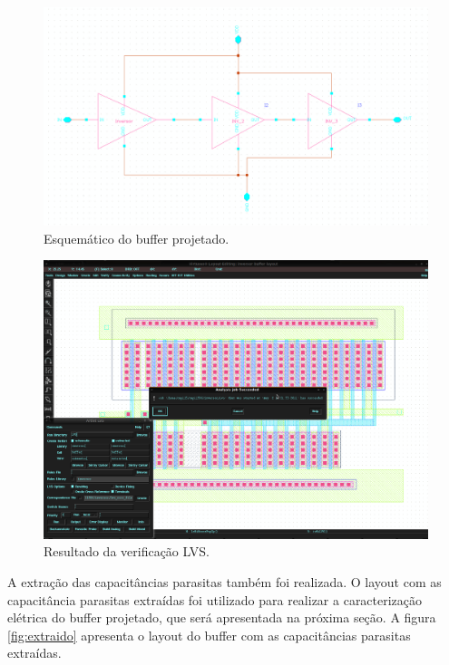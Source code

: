 \documentclass[a4paper,10pt] {article}
\begin{document}
\begin{figure} [h]
	\label{fig:esquematico}
	\centering
	\includegraphics[scale=0.15]{esquematico_buffer.png}
	\caption{Esquemático do buffer projetado.}
\end{figure}

\begin{figure} [h]
	\label{fig:lvs}
	\centering
	\includegraphics[scale=0.1]{LVS_buffer.png}
	\caption{Resultado da verificação LVS.}
\end{figure}

A extração das capacitâncias parasitas também foi realizada. O layout com as capacitância parasitas extraídas foi utilizado para realizar a caracterização elétrica do buffer projetado, que será apresentada na próxima seção. A figura \ref{fig:extraido} apresenta o layout do buffer com as capacitâncias parasitas extraídas.
\end{document}
